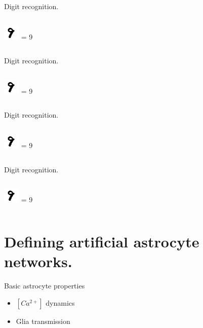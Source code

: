 \documentclass[10pt]{beamer}
\begin{document}
\begin{frame}[fragile]{Digit recognition.}
\begin{columns}
\centering
\includegraphics[scale=2]{images/nine.png} 
\centering
 = 9
\end{columns}
\end{frame}

\begin{frame}[fragile]{Digit recognition.}
\begin{columns}
\centering
\includegraphics[scale=2]{images/nine.png} 
\centering
 = 9
\end{columns}
\end{frame}
\begin{frame}[fragile]{Digit recognition.}
\begin{columns}
\centering
\includegraphics[scale=2]{images/nine.png} 
\centering
 = 9
\end{columns}
\end{frame}
\begin{frame}[fragile]{Digit recognition.}
\begin{columns}
\centering
\includegraphics[scale=2]{images/nine.png} 
\centering
 = 9
\end{columns}
\end{frame}

\section[AANs]{Defining artificial astrocyte networks.}

\begin{frame}[fragile]{Basic astrocyte properties}
\begin{itemize}
    \item $[Ca^{2+}]$ dynamics
    \item Glia transmission
\end{itemize}
\end{frame}
\end{document}
